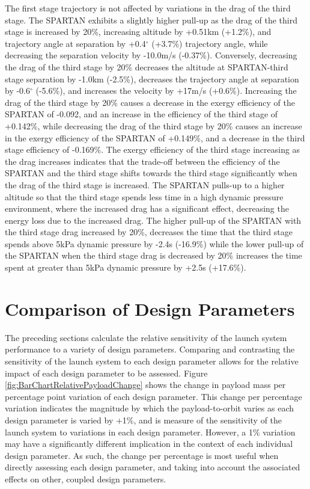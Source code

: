 The first stage trajectory is not affected by variations in the drag of the third stage. 
The SPARTAN exhibits a slightly higher pull-up as the drag of the third stage is increased by 20\%, increasing altitude by +0.51km (+1.2\%), and trajectory angle at separation by +0.4$^\circ$ (+3.7\%) trajectory angle, while decreasing the separation velocity by -10.0m/s (-0.37\%). Conversely, decreasing the drag of the third stage by 20\% decreases the altitude at SPARTAN-third stage separation by -1.0km (-2.5\%), decreases the trajectory angle at separation by -0.6$^\circ$ (-5.6\%), and increases the velocity by +17m/s (+0.6\%). 
Increasing the drag of the third stage by 20\% causes a decrease in the exergy efficiency of the SPARTAN of -0.092, and an increase in the efficiency of the third stage of +0.142\%, while decreasing the drag of the third stage by 20\% causes an increase in the exergy efficiency of the SPARTAN of +0.149\%, and a decrease in the third stage efficiency of -0.169\%. The exergy efficiency of the third stage increasing as the drag increases indicates that the trade-off between the efficiency of the SPARTAN and the third stage shifts towards the third stage significantly when the drag of the third stage is increased. The SPARTAN pulls-up to a higher altitude so that the third stage spends less time in a high dynamic pressure environment, where the increased drag has a significant effect, decreasing the energy loss due to the increased drag. The higher pull-up of the SPARTAN with the third stage drag increased by 20\%, decreases the time that the third stage spends above 5kPa dynamic pressure by -2.4s (-16.9\%) while the lower pull-up of the SPARTAN when the third stage drag is decreased by 20\% increases the time spent at greater than 5kPa dynamic pressure by +2.5s (+17.6\%).

\section{Comparison of Design Parameters}\label{sec:comparisonNoReturn}

The preceding sections calculate the relative sensitivity of the launch system performance to a variety of design parameters. 
Comparing and contrasting the sensitivity of the launch system to each design parameter allows for the relative impact of each design parameter to be assessed. 
Figure \ref{fig:BarChartRelativePayloadChange} shows the change in payload mass per percentage point variation of each design parameter. 
This change per percentage variation indicates the magnitude by which the payload-to-orbit varies as each design parameter is varied by +1\%, and is measure of the sensitivity of the launch system to variations in each design parameter. 
However, a 1\% variation may have a significantly different implication in the context of each individual design parameter. 
As such, the change per percentage is most useful when directly assessing each design parameter, and taking into account the associated effects on other, coupled design parameters. 

